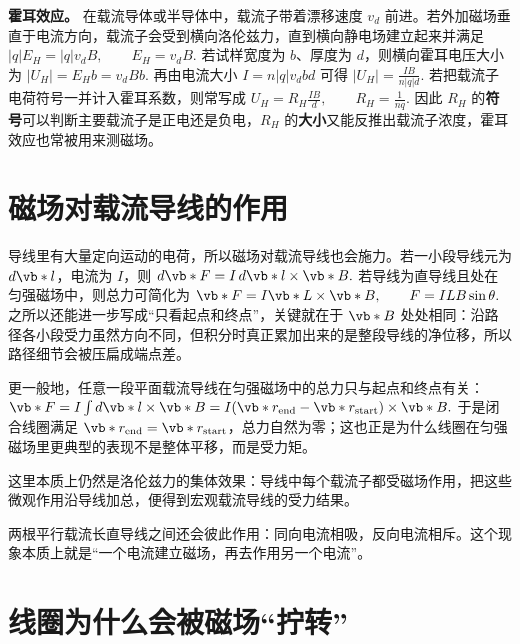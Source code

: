 \documentclass[lang=cn,11pt]{elegantbook}
\begin{document}
\textbf{霍耳效应。} 在载流导体或半导体中，载流子带着漂移速度 \(v_d\) 前进。若外加磁场垂直于电流方向，载流子会受到横向洛伦兹力，直到横向静电场建立起来并满足
 \(|q|E_H=|q|v_dB, \qquad E_H=v_dB.\) 
若试样宽度为 \(b\)、厚度为 \(d\)，则横向霍耳电压大小为
 \(|U_H|=E_Hb=v_dBb.\) 
再由电流大小
 \(I=n|q|v_dbd\) 
可得
 \(|U_H|=\frac{IB}{n|q|d}.\) 
若把载流子电荷符号一并计入霍耳系数，则常写成
 \(U_H=R_H\frac{IB}{d}, \qquad R_H=\frac{1}{nq}.\) 
因此 \(R_H\) 的\textbf{符号}可以判断主要载流子是正电还是负电，\(R_H\) 的\textbf{大小}又能反推出载流子浓度，霍耳效应也常被用来测磁场。

\section{磁场对载流导线的作用}

导线里有大量定向运动的电荷，所以磁场对载流导线也会施力。若一小段导线元为 \(d\vb*{l}\)，电流为 \(I\)，则
 \(d\vb*{F}=I\,d\vb*{l}\times \vb*{B}.\) 
若导线为直导线且处在匀强磁场中，则总力可简化为
 \(\vb*{F}=I\vb*{L}\times \vb*{B}, \qquad F=ILB\sin\theta.\) 
之所以还能进一步写成“只看起点和终点”，关键就在于 \(\vb*{B}\) 处处相同：沿路径各小段受力虽然方向不同，但积分时真正累加出来的是整段导线的净位移，所以路径细节会被压扁成端点差。

更一般地，任意一段平面载流导线在匀强磁场中的总力只与起点和终点有关：
 \(\vb*{F} =I\int d\vb*{l}\times \vb*{B} =I(\vb*{r}_{\mathrm{end}}-\vb*{r}_{\mathrm{start}})\times \vb*{B}.\) 
于是闭合线圈满足 \(\vb*{r}_{\mathrm{end}}=\vb*{r}_{\mathrm{start}}\)，总力自然为零；这也正是为什么线圈在匀强磁场里更典型的表现不是整体平移，而是受力矩。

这里本质上仍然是洛伦兹力的集体效果：导线中每个载流子都受磁场作用，把这些微观作用沿导线加总，便得到宏观载流导线的受力结果。

\begin{remark}
两根平行载流长直导线之间还会彼此作用：同向电流相吸，反向电流相斥。这个现象本质上就是“一个电流建立磁场，再去作用另一个电流”。
\end{remark}

\section{线圈为什么会被磁场“拧转”}
\end{document}
